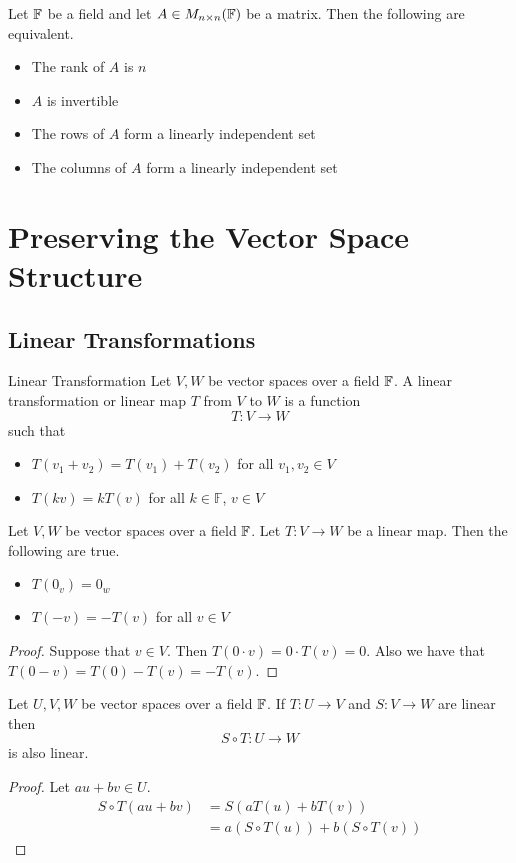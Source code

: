 \documentclass[a4paper]{article}
\begin{document}
\begin{prp}{}{} Let $\mathbb{F}$ be a field and let $A\in M_{n\times n}(\mathbb{F})$ be a matrix. Then the following are equivalent. 
\begin{itemize}
\item The rank of $A$ is $n$
\item $A$ is invertible
\item The rows of $A$ form a linearly independent set
\item The columns of $A$ form a linearly independent set
\end{itemize}
\end{prp}

\pagebreak
\section{Preserving the Vector Space Structure}
\subsection{Linear Transformations}
\begin{defn}{Linear Transformation}{} Let $V,W$ be vector spaces over a field $\mathbb{F}$. A linear transformation or linear map $T$ from $V$ to $W$ is a function $$T:V\to W$$ such that 
\begin{itemize}
\item $T(v_1+v_2)=T(v_1)+T(v_2)$ for all $v_1,v_2\in V$
\item $T(kv)=kT(v)$ for all $k\in\mathbb{F}$, $v\in V$
\end{itemize}
\end{defn}

\begin{lmm}{}{} Let $V,W$ be vector spaces over a field $\mathbb{F}$. Let $T:V\to W$ be a linear map. Then the following are true. 
\begin{itemize}
\item $T(0_v)=0_w$
\item $T(-v)=-T(v)$ for all $v\in V$
\end{itemize}
\begin{proof} Suppose that $v\in V$. Then $T(0\cdot v)=0\cdot T(v)=0$. Also we have that $T(0-v)=T(0)-T(v)=-T(v)$. 
\end{proof}
\end{lmm}

\begin{prp}{}{} Let $U,V,W$ be vector spaces over a field $\mathbb{F}$. If $T:U\to V$ and $S:V\to W$ are linear then $$S\circ T:U\to W$$ is also linear. 
\begin{proof} Let $au+bv\in U$. 
\begin{align*}
S\circ T(au+bv)&=S(aT(u)+bT(v))\\
&=a(S\circ T(u))+b(S\circ T(v))
\end{align*}
\end{proof}
\end{prp}
\end{document}
